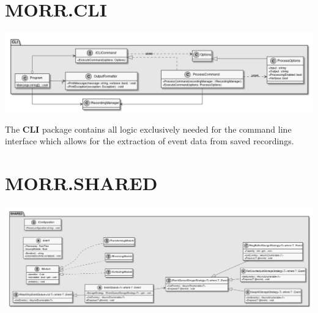 \begin{packif}
\end{packif}

\begin{packclass}
\end{packclass}

\newpage
\section{MORR.CLI}

\begin{center}
    \includegraphics[width=1.0\textwidth]{resources/Packages/CLI.png}
\end{center}

The \textbf{CLI} package contains all logic exclusively needed for the command line interface which allows for the extraction of event data from saved recordings.

\begin{packif}
\end{packif}

\begin{packclass}
\end{packclass}

\newpage
\section{MORR.SHARED}

\begin{center}
    \includegraphics[width=1.0\textwidth]{resources/Packages/SHARED.png}
\end{center}

